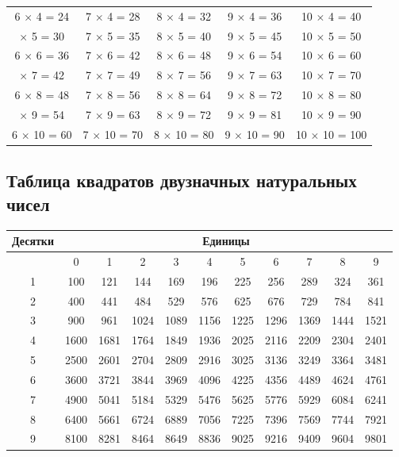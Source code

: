 \documentclass[a4paper, 14pt]{extarticle}
\begin{document}
{{\begin{center}
{\begin{tabular}{|c|c|c|c|c|}
\hline 
6 $\times$ 4 = 24 & 7 $\times$ 4 = 28 &8 $\times$ 4 = 32 &9 $\times$ 4 = 36 &10 $\times$ 4 = 40\\ 
\rowcolor{Gray}
\hline 
6 $\times$ 5 = 30 & 7 $\times$ 5 = 35 & 8 $\times$ 5 = 40 &9 $\times$ 5 = 45 &10 $\times$ 5 = 50\\
\hline 
6 $\times$ 6 = 36 & 7 $\times$ 6 = 42 &8 $\times$ 6 = 48 &9 $\times$ 6 = 54 &10 $\times$ 6 = 60\\ 
\rowcolor{Gray}
\hline 
6 $\times$ 7 = 42 & 7 $\times$ 7 = 49 &8 $\times$ 7 = 56 &9 $\times$ 7 = 63 &10 $\times$ 7 = 70\\
\hline 
6 $\times$ 8 = 48 & 7 $\times$ 8 = 56 &8 $\times$ 8 = 64 &9 $\times$ 8 = 72 &10 $\times$ 8 = 80\\ 
\rowcolor{Gray}
\hline 
6 $\times$ 9 = 54 &7 $\times$ 9 = 63 &8 $\times$ 9 = 72 &9 $\times$ 9 = 81 &10 $\times$ 9 = 90\\
\hline 
6 $\times$ 10 = 60 &7 $\times$ 10 = 70 &8 $\times$ 10 = 80 &9 $\times$ 10 = 90 &10 $\times$ 10 = 100\\ 
\hline 
\end{tabular} 
}
\end{center}
}



\subsection{Таблица квадратов двузначных натуральных чисел}

{\small
\begin{center}
{\setlength{\extrarowheight}{3pt}
\begin{tabular}{|c|c|c|c|c|c|c|c|c|c|c|}
\hline 
\rowcolor{Gray}
Десятки & \multicolumn{10}{c|}{Единицы} \\ 
\hline 
& 0 & 1 & 2 & 3 & 4 & 5 & 6 & 7 & 8 & 9 \\ 
\hline 
\rowcolor{Gray}
1 & 100 & 121 & 144 & 169 & 196 & 225 & 256 & 289 & 324 & 361 \\ 
\hline 
2 & 400 & 441 & 484 & 529 & 576 & 625 & 676 & 729 & 784 & 841 \\ 
\hline 
\rowcolor{Gray}
3 & 900 & 961 & 1024 & 1089 & 1156 & 1225 & 1296 & 1369 & 1444 & 1521 \\ 
\hline 
4 & 1600 & 1681 & 1764 & 1849 & 1936 & 2025 & 2116 & 2209 & 2304 & 2401 \\ 
\hline 
\rowcolor{Gray}
5 & 2500 & 2601 & 2704 & 2809 & 2916 & 3025 & 3136 & 3249 & 3364 & 3481 \\ 
\hline 
6 & 3600 & 3721 & 3844 & 3969 & 4096 & 4225 & 4356 & 4489 & 4624 & 4761 \\ 
\hline 
\rowcolor{Gray}
7 & 4900 & 5041 & 5184 & 5329 & 5476 & 5625 & 5776 & 5929 & 6084 & 6241 \\ 
\hline 
8 & 6400 & 5661 & 6724 & 6889 & 7056 & 7225 & 7396 & 7569 & 7744 & 7921 \\ 
\hline 
\rowcolor{Gray}
9 & 8100 & 8281 & 8464 & 8649 & 8836 & 9025 & 9216 & 9409 & 9604 & 9801 \\ 
\hline 
\end{tabular} 
}
\end{center}
}

}
\end{document}
